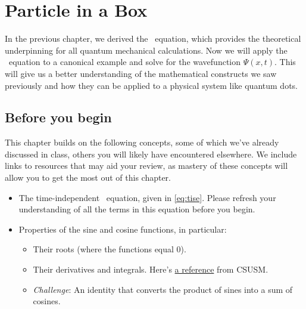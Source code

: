 

%

\chapter{Particle in a Box} \label{ch:box}

In the previous chapter, we derived the \Sch\ equation, which provides the theoretical underpinning for all quantum mechanical calculations. 
Now we will apply the \Sch\ equation to a canonical example and solve for the wavefunction $\Psi(x,t)$. 
This will give us a better understanding of the mathematical constructs we saw previously and how they can be applied to a physical system like quantum dots.


\section{Before you begin}

This chapter builds on the following concepts, some of which we've already discussed in class, others you will likely have encountered elsewhere.
We include links to resources that may aid your review, as mastery of these concepts will allow you to get the most out of this chapter.

\begin{itemize}
	\item The time-independent \Sch\ equation, given in \autoref{eq:tise}.
	Please refresh your understanding of all the terms in this equation before you begin.
	
	\item Properties of the sine and cosine functions, in particular:
	\begin{itemize}
		\item Their roots (where the functions equal 0).
		
		\item Their derivatives and integrals.
		Here's \href{https://www.csusm.edu/lts/studentresources/handouts/calc_trig_derivatives_integrals.pdf}{a reference} from CSUSM.
		
		\item \emph{Challenge}: An identity that converts the product of sines into a sum of cosines.
	\end{itemize}
\end{itemize}

